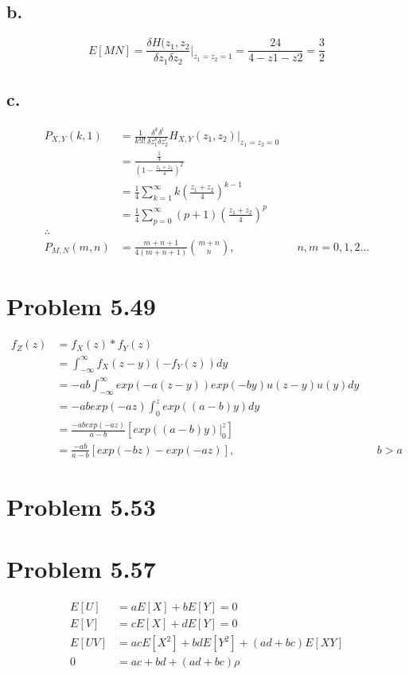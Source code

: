 \documentclass[12pt]{article}
\begin{document}
\subsection{b.}
\[
E[MN] = \frac{\delta H(z_1,z_2}{\delta z_1 \delta z_2}\big|_{z_1 = z_2 = 1} = \frac{24}{4-z1-z2} = \frac{3}{2}
\]

\subsection{c.}
\begin{align*}
  P_{X,Y}(k,1) &= \frac{1}{k!l!} \frac{\delta^k \delta^l}{\delta z_1^k \delta z_2^l} H_{X,Y}(z_1,z_2)\big|_{z_1=z_2=0} \\
  &= \frac{\frac{1}{4}}{(1-\frac{z_1+z_2}{4})^2} \\
  &= \frac{1}{4} \sum_{k=1}^\infty k \left(\frac{z_1+z_2}{4}\right)^{k-1} \\
  &= \frac{1}{4} \sum_{p=0}^\infty (p+1) \left(\frac{z_1+z_2}{4}\right)^p \\
  \therefore \\
  P_{M,N}(m,n) &= \frac{m+n+1}{4(m+n+1)} \binom{m+n}{n}, & & n,m = 0 , 1 , 2 \dots
\end{align*}

\section{Problem 5.49}
\begin{align*}
f_Z(z) &= f_X(z) * f_Y(z) \\
&= \int_{-\infty}^\infty f_X(z-y)(-f_Y(z))dy \\
&= -ab\int_{-\infty}^\infty exp(-a(z-y))exp(-by)u(z-y)u(y)dy \\
&= -abexp(-az)\int_{0}^z exp((a-b)y)dy \\
&= \frac{-abexp(-az)}{a-b}\left[ exp((a-b)y)\big|_0^z \right] \\
&= \frac{-ab}{a-b}\left[ exp(-bz)-exp(-az) \right], & & b>a
\end{align*}

\section{Problem 5.53}

\section{Problem 5.57}
\begin{align*}
  E[U] &= aE[X] + bE[Y] = 0 \\
  E[V] &= cE[X] + dE[Y] = 0 \\
  E[UV] &= acE[X^2] + bdE[Y^2] + (ad+bc)E[XY] \\
  0 &= ac + bd + (ad+bc)\rho
\end{align*}
\end{document}
